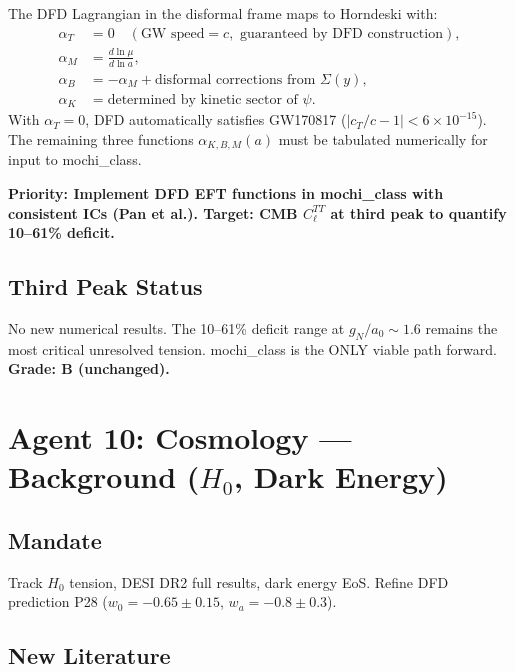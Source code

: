 \documentclass[11pt,a4paper]{article}
\begin{document}
The DFD Lagrangian in the disformal frame maps to Horndeski with:
\begin{align}
\alpha_T &= 0 \quad (\text{GW speed} = c, \text{ guaranteed by DFD construction}), \\
\alpha_M &= \frac{d\ln\mu}{d\ln a}, \\
\alpha_B &= -\alpha_M + \text{disformal corrections from } \Sigma(y), \\
\alpha_K &= \text{determined by kinetic sector of } \psi.
\end{align}
With $\alpha_T = 0$, DFD automatically satisfies GW170817 ($|c_T/c - 1| < 6\times10^{-15}$). The remaining three functions $\alpha_{K,B,M}(a)$ must be tabulated numerically for input to mochi\_class.

\textbf{Priority: Implement DFD EFT functions in mochi\_class with consistent ICs (Pan et al.). Target: CMB $C_\ell^{TT}$ at third peak to quantify 10--61\% deficit.}

\subsection{Third Peak Status}
No new numerical results. The 10--61\% deficit range at $g_N/a_0 \sim 1.6$ remains the most critical unresolved tension. mochi\_class is the ONLY viable path forward. \textbf{Grade: B (unchanged).}

\section{Agent 10: Cosmology --- Background ($H_0$, Dark Energy)}

\subsection{Mandate}
Track $H_0$ tension, DESI DR2 full results, dark energy EoS. Refine DFD prediction P28 ($w_0 = -0.65\pm0.15$, $w_a = -0.8\pm0.3$).

\subsection{New Literature}
\end{document}

